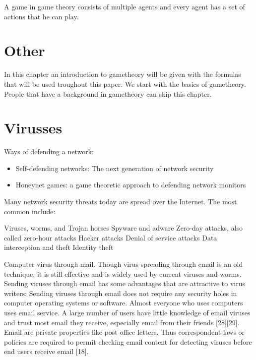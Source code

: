 A game in game theory consists of multiple agents and every agent has a set of actions that he can play. 








\section{Other}
In this chapter an introduction to gametheory will be given with the formulas that will be used troughout this paper. We start with the basics of gametheory. People that have a background in gametheory can skip this chapter.

\section{Virusses}
Ways of defending a network:
\begin{itemize}
\item Self-defending networks: The next generation of network security
\item Honeynet games: a game theoretic approach to defending network monitors

\end{itemize}
Many network security threats today are spread over the Internet. The most common include:

Viruses, worms, and Trojan horses
Spyware and adware
Zero-day attacks, also called zero-hour attacks
Hacker attacks
Denial of service attacks
Data interception and theft
Identity theft


Computer virus through mail. 
Though virus spreading through email is an old technique, it is still effective and is widely used by
current viruses and worms. Sending viruses through email has some advantages that are attractive to
virus writers:
 Sending viruses through email does not require any security holes in computer operating systems
or software.
 Almost everyone who uses computers uses email service.
 A large number of users have little knowledge of email viruses and trust most email they receive,
especially email from their friends [28][29].
 Email are private properties like post office letters. Thus correspondent laws or policies are required
to permit checking email content for detecting viruses before end users receive email [18].

